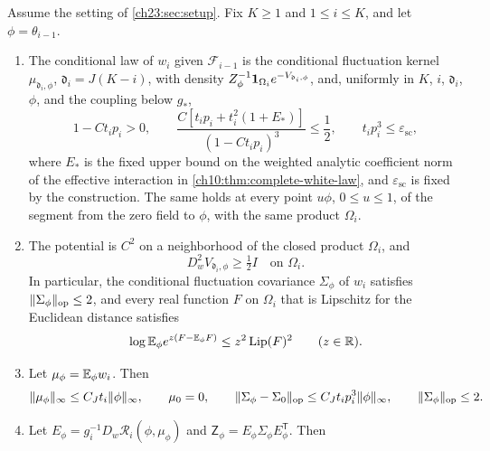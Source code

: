 \begin{lemma}\label{ch24:lem:conditional-kernel}
Assume the setting of \cref{ch23:sec:setup}. Fix $K\ge1$ and $1\le i\le K$, and let $\phi=\theta_{i-1}$.
\begin{enumerate}
\item The conditional law of $w_i$ given $\mathcal F_{i-1}$ is the conditional fluctuation kernel $\mu_{\mathfrak d_i,\phi}$, $\mathfrak d_i=J(K-i)$, with density $Z_\phi^{-1}\mathbf 1_{\Omega_i}e^{-V_{\mathfrak d_i,\phi}}$, and, uniformly in $K$, $i$, $\mathfrak d_i$, $\phi$, and the coupling below $g_*$,
\begin{equation}\label{ch24:eq:complete-kernel-gates}
 1-Ct_ip_i>0,\qquad
 \frac{C[t_ip_i+t_i^2(1+E_*)]}{(1-Ct_ip_i)^3}\le\frac12,
 \qquad t_ip_i^3\le\varepsilon_{\mathrm{sc}},
\end{equation}
where $E_*$ is the fixed upper bound on the weighted analytic coefficient norm of the effective interaction in \cref{ch10:thm:complete-white-law}, and $\varepsilon_{\mathrm{sc}}$ is fixed by the construction. The same holds at every point $u\phi$, $0\le u\le1$, of the segment from the zero field to $\phi$, with the same product $\Omega_i$.
\item The potential is $C^2$ on a neighborhood of the closed product $\Omega_i$, and
\begin{equation}\label{ch24:eq:actual-product-hessian}
 D_w^2V_{\mathfrak d_i,\phi}\ge\tfrac12I\quad\text{on }\Omega_i.
\end{equation}
In particular, the conditional fluctuation covariance $\Sigma_\phi$ of $w_i$ satisfies $\lVert \Sigma_\phi\rVert_{\mathrm{op}}\le2$, and every real function $F$ on $\Omega_i$ that is Lipschitz for the Euclidean distance satisfies
\begin{equation}\label{ch24:eq:actual-kernel-concentration}
 \log\mathbb E_\phi e^{z(F-\mathbb E_\phi F)}\le z^2\operatorname{Lip}(F)^2\qquad(z\in\mathbb R).
\end{equation}
\item Let $\mu_\phi=\mathbb E_\phi w_i$. Then
\begin{equation}\label{ch24:eq:uniform-white-covariance}
 \lVert \mu_\phi\rVert_\infty\le C_Jt_i\lVert \phi\rVert_\infty,\qquad \mu_0=0,\qquad
 \lVert \Sigma_\phi-\Sigma_0\rVert_{\mathrm{op}}\le C_Jt_ip_i^3\lVert \phi\rVert_\infty,\qquad \lVert \Sigma_\phi\rVert_{\mathrm{op}}\le2.
\end{equation}
\item Let $E_\phi=g_i^{-1}D_w\mathscr R_i(\phi,\mu_\phi)$ and $\mathsf Z_\phi=E_\phi\Sigma_\phi E_\phi^{\mathsf T}$. Then
\begin{equation}\label{ch24:eq:uniform-linear-coefficient}

\end{equation}
\end{enumerate}
\end{lemma}
